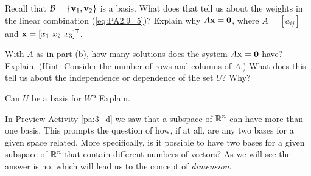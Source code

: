 \begin{pa}
	\item Recall that $\mathcal{B} = \{\mathbf{v}_1, \mathbf{v}_2\}$ is a basis. What does that tell us about the weights in the linear combination (\ref{eq:PA2.9_5})? Explain why $A \mathbf{x} = \mathbf{0}$, where $A = [a_{ij}]$ and $\vx = [x_1 \ x_2 \ x_3]^{\tr}$. 

	\item With $A$ as in part (b), how many solutions does the system $A \mathbf{x} = \mathbf{0}$ have? Explain. (Hint: Consider the number of rows and columns of $A$.) What does this tell us about the independence or dependence of the set $U$? Why?


	\item Can $U$ be a basis for $W$? Explain. 

	\ea

\ee

\end{pa}



In Preview Activity \ref{pa:3_d} we saw that a subspace of $\mathbb{R}^n$ can have more than one basis. This prompts the question of how, if at all, are any two bases for a given space related. More specifically, is it possible to have two bases for a given subspace of $\mathbb{R}^n$ that contain different numbers of vectors? As we will see the answer is no, which will lead us to the concept of \emph{dimension}. 

